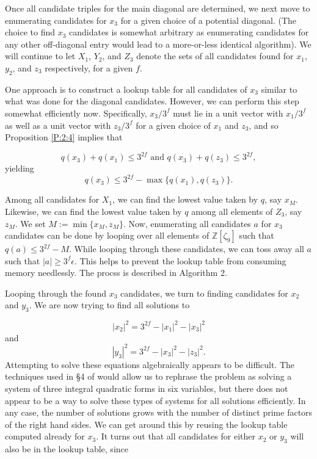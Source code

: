 \documentclass[12pt]{amsart}
\theoremstyle{definition}
\newcommand{\Zn}{\mathbb{Z}[\zeta_9]}
\begin{document}
	Once all candidate triples for the main diagonal are determined, we next move to enumerating candidates for $x_3$ for a given choice of a potential diagonal. (The choice to find $x_3$ candidates is somewhat arbitrary as enumerating candidates for any other off-diagonal entry would lead to a more-or-less identical algorithm). We will continue to let $X_1$, $Y_2$, and $Z_3$ denote the sets of all candidates found for $x_1$, $y_2$, and $z_3$ respectively, for a given $f$.
	
	One approach is to construct a lookup table for all candidates of $x_3$ similar to what was done for the diagonal candidates. However, we can perform this step somewhat efficiently now. Specifically, $x_3/3^f$ must lie in a unit vector with $x_1/3^f$ as well as a unit vector with $z_3/3^f$ for a given choice of $x_1$ and $z_3$, and so Proposition \ref{P:2:4} implies that
	
	$$
		q(x_3) + q(x_1) \leq 3^{2f} \mbox{ and } q(x_3) + q(z_3) \leq 3^{2f},
	$$ yielding
	\begin{equation}
		q(x_3) \leq 3^{2f} - \max\{q(x_1),q(z_3)\}.
	\end{equation}
	
	Among all candidates for $X_1$, we can find the lowest value taken by $q$, say $x_M$. Likewise, we can find the lowest value taken by $q$ among all elements of $Z_3$, say $z_M$. We set $M := \min\{x_M, z_M\}$. Now, enumerating all candidates $a$ for $x_3$ candidates can be done by looping over all elements of $\Zn$ such that $q(a) \leq 3^{2f} - M$. While looping through these candidates, we can toss away all $a$ such that $|a| \geq 3^{f}\epsilon$. This helps to prevent the lookup table from consuming memory needlessly. The procss is described in Algorithm 2.
	
	Looping through the found $x_3$ candidates, we turn to finding candidates for $x_2$ and $y_3$. We are now trying to find all solutions to 
	
	$$
	|x_2|^2 = 3^{2f} - |x_1|^2 - |x_3|^2
	$$ and $$
	|y_3|^2 = 3^{2f} - |x_3|^2 - |z_3|^2.
	$$
	Attempting to solve these equations algebraically appears to be difficult. The techniques used in \S4 of \cite{Kal} would allow us to rephrase the problem as solving a system of three integral quadratic forms in six variables, but there does not appear to be a way to solve these types of systems for all solutions efficiently. In any case, the number of solutions grows with the number of distinct prime factors of the right hand sides. We can get around this by reusing the lookup table computed already for $x_3$.  It turns out that all candidates for either $x_2$ or $y_3$ will also be in the lookup table, since 
	
\end{document}
